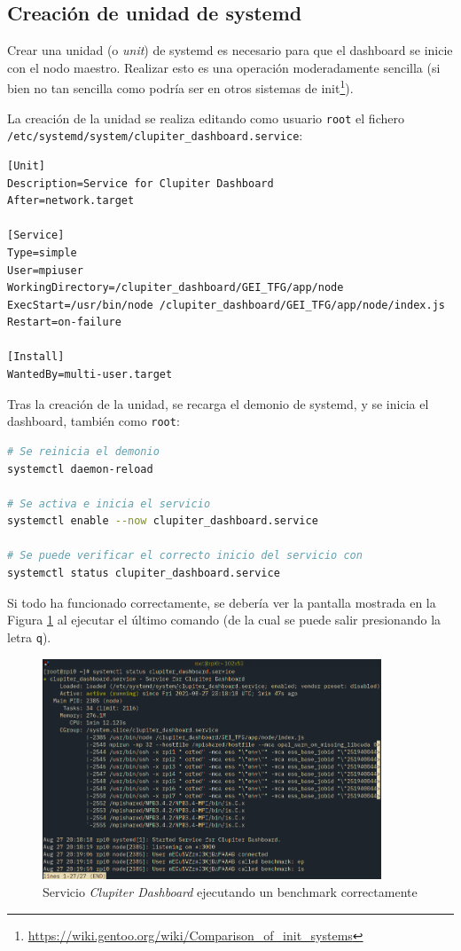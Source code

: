 \subsection{Creación de unidad de systemd}
Crear una unidad (o \textit{unit}) de systemd es necesario para que el dashboard se inicie con el nodo maestro. Realizar esto es una operación moderadamente sencilla (si bien no tan sencilla como podría ser en otros sistemas de init\footnote{\url{https://wiki.gentoo.org/wiki/Comparison_of_init_systems}}). 

La creación de la unidad se realiza editando como usuario \texttt{root} el fichero \texttt{/etc/systemd/system/clupiter\_dashboard.service}:

\begin{lstlisting}[]
[Unit]
Description=Service for Clupiter Dashboard
After=network.target

[Service]
Type=simple
User=mpiuser
WorkingDirectory=/clupiter_dashboard/GEI_TFG/app/node
ExecStart=/usr/bin/node /clupiter_dashboard/GEI_TFG/app/node/index.js
Restart=on-failure

[Install]
WantedBy=multi-user.target
\end{lstlisting}

Tras la creación de la unidad, se recarga el demonio de systemd, y se inicia el dashboard, también como \texttt{root}:
\begin{lstlisting}[language=bash]
# Se reinicia el demonio
systemctl daemon-reload

# Se activa e inicia el servicio
systemctl enable --now clupiter_dashboard.service

# Se puede verificar el correcto inicio del servicio con
systemctl status clupiter_dashboard.service
\end{lstlisting}

Si todo ha funcionado correctamente, se debería ver la pantalla mostrada en la Figura \ref{fig:systemd_clupiter_dashboard} al ejecutar el último comando (de la cual se puede salir presionando la letra \texttt{q}).

\begin{figure}[h!]
  \centering
  \vspace*{0.5cm}
  \includegraphics[width=0.9\textwidth]{img/systemd_clupiter_dashboard.png}
  \caption{Servicio \textit{Clupiter Dashboard} ejecutando un benchmark correctamente}
  \label{fig:systemd_clupiter_dashboard}
\end{figure}

